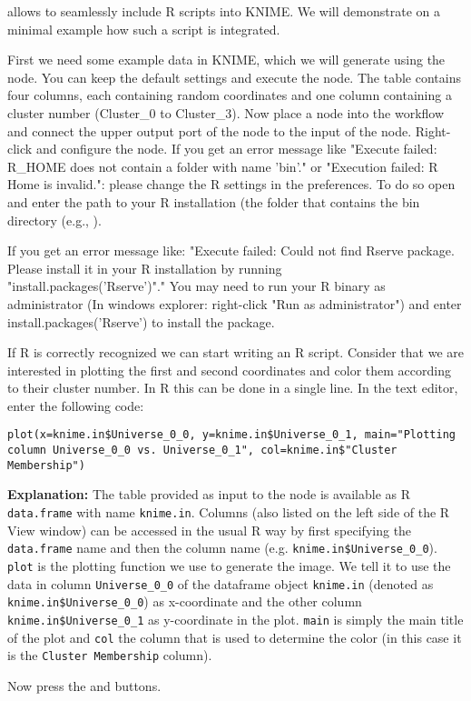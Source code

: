  allows to seamlessly include R scripts into KNIME. We will demonstrate on a minimal 
example how such a script is integrated.

\begin{task}
First we need some example data in KNIME, which we will generate using the  node. You can 
keep the default settings and execute the node. The table contains four columns, each containing random coordinates 
and one column containing a cluster number (Cluster\_0 to Cluster\_3). Now place a  node 
into the workflow and connect the upper output port of the  node to the input of the 
 node. Right-click and configure the node.
If you get an error message like "Execute failed: R\_HOME does not contain a folder with name 'bin'." or "Execution 
failed: R Home is invalid.": please change the R settings in the preferences. To do so open  and enter the path to your R installation (the folder that contains the bin directory (e.g., ).

If you get an error message like:
"Execute failed: Could not find Rserve package. Please install it in your R installation by running \\ 
"install.packages('Rserve')"." You may need to run your R binary as administrator (In windows explorer: right-click 
"Run as administrator") and enter install.packages('Rserve') to install the package.

If R is correctly recognized we can start writing an R script. Consider that we are interested in plotting the first 
and second coordinates and color them according to their cluster number. In R this can be done in a single line.
In the  text editor, enter the following code: \\
\begin{verbatim}
plot(x=knime.in$Universe_0_0, y=knime.in$Universe_0_1, main="Plotting column Universe_0_0 vs. Universe_0_1", col=knime.in$"Cluster Membership")
\end{verbatim}
        
\textbf{Explanation:}
The table provided as input to the  node is available as R \texttt{data.frame} with name 
\texttt{knime.in}. Columns (also listed on the left side of the R View window) can be accessed in the usual R way by 
first specifying the \texttt{data.frame} name and then the column name (e.g. \texttt{knime.in\$Universe\_0\_0}).
\texttt{plot} is the plotting function we use to generate the image. We tell it to use the data in column 
\texttt{Universe\_0\_0} of the dataframe object \texttt{knime.in} (denoted as \texttt{knime.in\$Universe\_0\_0}) as 
x-coordinate and the other column \texttt{knime.in\$Universe\_0\_1} as y-coordinate in the plot. \texttt{main} is 
simply the main title of the plot and \texttt{col} the column that is used to determine the color (in this case it is 
the \texttt{Cluster Membership} column).

Now press the  and  buttons.
\end{task}

